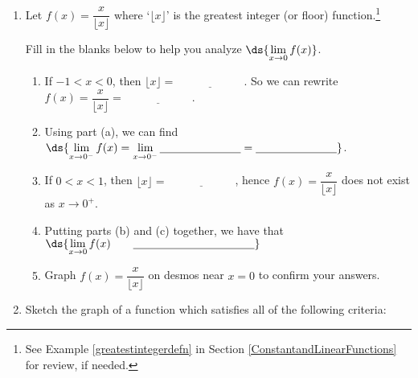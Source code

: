 \documentclass{ximera}
\begin{document}
\begin{enumerate}
\setcounter{enumi}{\value{HW}}

\item  Let $f(x) = \dfrac{x}{\lfloor x \rfloor}$  where `$\lfloor x \rfloor$'  is the greatest integer (or floor) function.\footnote{See Example \ref{greatestintegerdefn} in Section \ref{ConstantandLinearFunctions} for review, if needed.} 

\smallskip

Fill in the blanks below to help you analyze $\ds{ \lim_{x \rightarrow 0} f(x)}$.

\smallskip

\begin{enumerate}

\item  If $-1 < x < 0$, then $\lfloor x \rfloor = \underline{\hspace{1in}}$. So we can rewrite $f(x) = \dfrac{x}{\lfloor x \rfloor} =  \underline{\hspace{1in}}$.

\item  Using part (a), we can find  $\ds{ \lim_{x \rightarrow 0^{-}} f(x) =  \lim_{x \rightarrow 0^{-}}  \underline{\hspace{1in}} =  \underline{\hspace{1in}} }$.

\item  If $0 < x < 1$, then $\lfloor x \rfloor = \underline{\hspace{1in}}$, hence $f(x) = \dfrac{x}{\lfloor x \rfloor}$ does not exist as $x \rightarrow 0^{+}$.

\item  Putting parts (b) and (c) together, we have that   $\ds{ \lim_{x \rightarrow 0} f(x)  \qquad \underline{\hspace{1.5in}}}$

\item  Graph $f(x) = \dfrac{x}{\lfloor x \rfloor}$ on desmos near $x = 0$ to confirm your answers.

\end{enumerate}

\newpage

\item  Sketch the graph of a function which satisfies all of the following criteria:

\bigskip

\begin{multicols}{4}


\end{multicols}
\end{enumerate}
\end{document}
